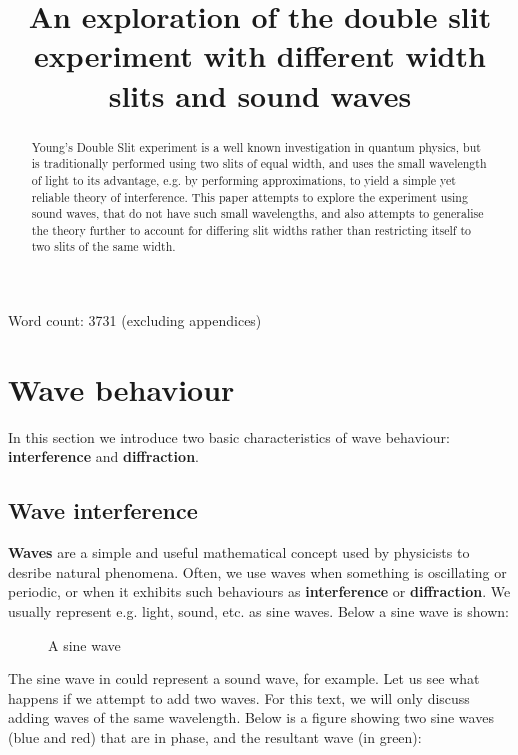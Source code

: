 \documentclass{paper}
\date{}
\author{}
\title{An exploration of the double slit experiment with different width slits and sound waves}
\begin{document}
 
\maketitle
\begin{abstract}
    Young's Double Slit experiment is a well known investigation
    in quantum physics, but is traditionally performed using two
    slits of equal width, and uses the small wavelength of light
    to its advantage, e.g. by performing approximations, to yield
    a simple yet reliable theory of interference. This paper 
    attempts to explore the experiment using sound waves,
    that do not have such small wavelengths, and also attempts to 
    generalise the theory further to account for differing slit widths
    rather than restricting itself to two slits of the same width.
\end{abstract}

Word count: 3731 (excluding appendices)

\pagebreak
\tableofcontents
\pagebreak
\section{Wave behaviour}
In this section we introduce two basic characteristics of wave behaviour: \textbf{interference} and \textbf{diffraction}. 
\subsection{Wave interference}
\textbf{Waves} are a simple and useful mathematical concept used by physicists to desribe natural phenomena. Often, we use waves when something is oscillating or periodic, or when it exhibits such behaviours as \textbf{interference} or \textbf{diffraction}. We usually represent e.g. light, sound, etc. as sine waves. Below a sine wave is shown:

\begin{figure}[H]
\caption{A sine wave}
\label{fig:sine-wave}
\end{figure}

The sine wave in  could represent a sound wave, for example. Let us see what happens if we attempt to add two waves. For this text, we will only discuss adding waves of the same wavelength. Below is a figure showing two sine waves (blue and red) that are in phase, and the resultant wave (in green):
\end{document}
